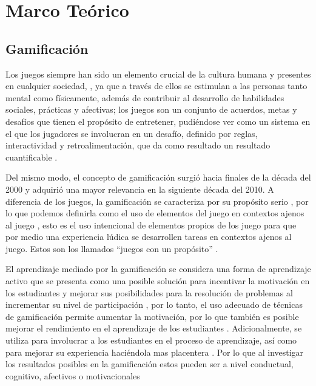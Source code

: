 %

\section{Marco Teórico}

\subsection{Gamificación}

Los juegos siempre han sido un elemento crucial de la cultura humana y presentes en cualquier sociedad,
\cite{KRATH2021106963}, ya que a través de ellos se estimulan a las personas tanto mental como físicamente, 
además de contribuir al desarrollo de habilidades sociales, prácticas y afectivas; los juegos son un conjunto
de acuerdos, metas y desafíos que tienen el propósito de entretener, pudiéndose ver como un sistema en el que
los jugadores se involucran en un desafío, definido por reglas, interactividad y retroalimentación, que da 
como resultado un resultado cuantificable \cite{baldeon2015}.

Del mismo modo, el concepto de gamificación surgió hacia finales de la década del 2000 y adquirió una mayor 
relevancia en la siguiente década del 2010. A diferencia de los juegos, la gamificación se caracteriza por su 
propósito serio \cite{KRATH2021106963}, por lo que podemos definirla como el uso de elementos del juego en 
contextos ajenos al juego \cite{KRATH2021106963}, esto es el uso intencional de elementos propios de los juego 
para que por medio una experiencia lúdica se desarrollen tareas en contextos ajenos al juego. Estos son los 
llamados ``juegos con un propósito'' \cite{PRESTOPNIK2015492}.

El aprendizaje mediado por la gamificación se considera una forma de aprendizaje activo que se presenta como 
una posible solución para incentivar la motivación en los estudiantes y mejorar sus posibilidades para la 
resolución de problemas al incrementar su nivel de participación \cite{PUTZ2020106392}, por lo tanto, el uso
adecuado de técnicas de gamificación permite aumentar la motivación, por lo que también es posible mejorar el 
rendimiento en el aprendizaje de los estudiantes \cite{KUSUMA2021886}. Adicionalmente, se utiliza para 
involucrar a los estudiantes en el proceso de aprendizaje, así como para mejorar su experiencia haciéndola 
mas placentera \cite{SBIE8805}. Por lo que al investigar los resultados posibles en la gamificación estos 
pueden ser a nivel conductual, cognitivo, afectivos o motivacionales \cite{KRATH2021106963}

